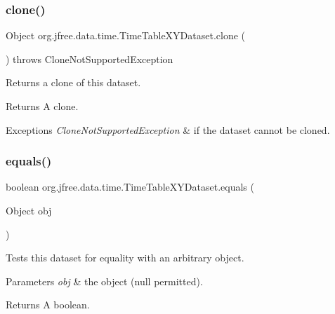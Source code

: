\subsubsection{\texorpdfstring{clone()}{clone()}}
{\footnotesize\ttfamily Object org.\+jfree.\+data.\+time.\+Time\+Table\+X\+Y\+Dataset.\+clone (\begin{DoxyParamCaption}{ }\end{DoxyParamCaption}) throws Clone\+Not\+Supported\+Exception}

Returns a clone of this dataset.

\begin{DoxyReturn}{Returns}
A clone.
\end{DoxyReturn}

\begin{DoxyExceptions}{Exceptions}
{\em Clone\+Not\+Supported\+Exception} & if the dataset cannot be cloned. \\
\hline
\end{DoxyExceptions}
\mbox{\label{classorg_1_1jfree_1_1data_1_1time_1_1_time_table_x_y_dataset_aff3bb17c934999eeeb756e0c862a6f36}} 
\subsubsection{\texorpdfstring{equals()}{equals()}}
{\footnotesize\ttfamily boolean org.\+jfree.\+data.\+time.\+Time\+Table\+X\+Y\+Dataset.\+equals (\begin{DoxyParamCaption}\item[{Object}]{obj }\end{DoxyParamCaption})}

Tests this dataset for equality with an arbitrary object.


\begin{DoxyParams}{Parameters}
{\em obj} & the object ({\ttfamily null} permitted).\\
\hline
\end{DoxyParams}
\begin{DoxyReturn}{Returns}
A boolean. 
\end{DoxyReturn}
\mbox{\label{classorg_1_1jfree_1_1data_1_1time_1_1_time_table_x_y_dataset_ac8ffe14dbf4e3a9934c19222d97acbfe}} 
